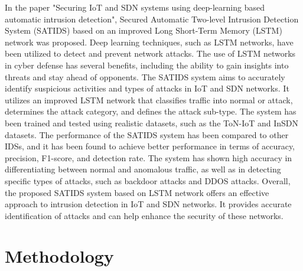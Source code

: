 \par 
In the paper "Securing IoT and SDN systems using deep-learning based automatic intrusion detection", Secured Automatic Two-level Intrusion Detection System (SATIDS) based on an improved Long Short-Term Memory (LSTM) network was proposed. Deep learning techniques, such as LSTM networks, have been utilized to detect and prevent network attacks. The use of LSTM networks in cyber defense has several benefits, including the ability to gain insights into threats and stay ahead of opponents. The SATIDS system aims to accurately identify suspicious activities and types of attacks in IoT and SDN networks. It utilizes an improved LSTM network that classifies traffic into normal or attack, determines the attack category, and defines the attack sub-type. The system has been trained and tested using realistic datasets, such as the ToN-IoT and InSDN datasets. The performance of the SATIDS system has been compared to other IDSs, and it has been found to achieve better performance in terms of accuracy, precision, F1-score, and detection rate. The system has shown high accuracy in differentiating between normal and anomalous traffic, as well as in detecting specific types of attacks, such as backdoor attacks and DDOS attacks. Overall, the proposed SATIDS system based on LSTM network offers an effective approach to intrusion detection in IoT and SDN networks. It provides accurate identification of attacks and can help enhance the security of these networks.\cite{ELSAYED2023102211}
\chapter{Methodology}
\vspace{-18pt}
